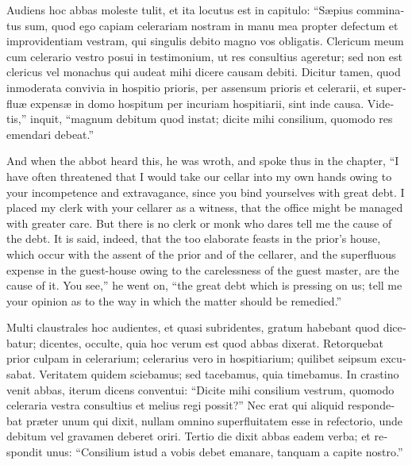 \documentclass{book}
\begin{document}
\begin{paracol}{2}
\switchcolumn*

\begin{otherlanguage}{latin}
Audiens hoc abbas moleste tulit, et ita locutus est in capitulo: ``S\ae{}pius comminatus sum, quod  ego capiam celerariam nostram in manu mea propter defectum et improvidentiam vestram, qui singulis debito magno vos obligatis. Clericum meum cum celerario vestro posui in testimonium, ut res consultius ageretur; sed non est clericus vel monachus qui audeat mihi dicere causam debiti. Dicitur tamen, quod inmoderata convivia in hospitio prioris, per assensum prioris et celerarii, et superflu\ae{} expens\ae{} in domo hospitum per incuriam hospitiarii, sint inde causa. Videtis,'' inquit, ``magnum debitum quod instat; dicite mihi consilium, quomodo res emendari debeat.''
\end{otherlanguage}

\switchcolumn

And when the abbot heard this, he was wroth, and spoke thus in the chapter, ``I have often threatened that I would take our cellar into my own hands owing to your incompetence and extravagance, since you bind yourselves with great debt. I placed my clerk with your cellarer as a witness, that the office might be managed with greater care. But there is no clerk or monk who dares tell me the cause of the debt. It is said, indeed, that the too elaborate feasts in the prior's house, which occur with the assent of the prior and of the cellarer, and the superfluous expense in the guest-house owing to the carelessness of the guest master, are the cause of it. You see,'' he went on, ``the great debt which is pressing on us; tell me your opinion as to the way in which the matter should be remedied.''

\switchcolumn*

\begin{otherlanguage}{latin}
Multi claustrales hoc audientes, et quasi subridentes, gratum habebant quod dicebatur; dicentes, occulte, quia hoc verum est quod abbas dixerat. Retorquebat prior culpam in celerarium; celerarius vero in hospitiarium; quilibet seipsum excusabat. Veritatem quidem sciebamus; sed tacebamus, quia timebamus. In crastino venit abbas, iterum dicens conventui: ``Dicite mihi consilium vestrum, quomodo celeraria vestra consultius et melius regi possit?'' Nec erat qui aliquid respondebat pr\ae{}ter unum qui dixit, nullam omnino superfluitatem esse in refectorio, unde debitum vel gravamen deberet oriri. Tertio die dixit abbas eadem verba; et respondit unus: ``Consilium istud a vobis debet emanare, tanquam a capite nostro.''
\end{otherlanguage}


\end{paracol}
\end{document}
